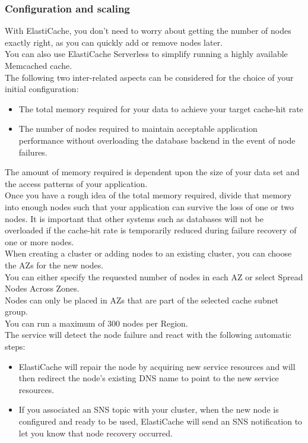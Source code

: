 \documentclass[12pt, letterpaper, twoside]{article}
\begin{document}
\subsubsection{Configuration and scaling}
With ElastiCache, you don't need to worry about getting the number of nodes exactly right, as you can quickly add 
or remove nodes later.\\
You can also use ElastiCache Serverless to simplify running a highly available Memcached cache.\\
The following two inter-related aspects can be considered for the choice of your initial configuration:
\begin{itemize}
	\item The total memory required for your data to achieve your target cache-hit rate
	\item The number of nodes required to maintain acceptable application performance without overloading the database 
		backend in the event of node failures.
\end{itemize}
The amount of memory required is dependent upon the size of your data set and the access patterns of your application.\\
Once you have a rough idea of the total memory required, divide that memory into enough nodes such that your application 
can survive the loss of one or two nodes.
It is important that other systems such as databases will not be overloaded if the cache-hit rate is temporarily reduced 
during failure recovery of one or more nodes.\\

When creating a cluster or adding nodes to an existing cluster, you can choose the AZs for the new nodes.\\
You can either specify the requested number of nodes in each AZ or select Spread Nodes Across Zones.\\
Nodes can only be placed in AZs that are part of the selected cache subnet group.\\

You can run a maximum of 300 nodes per Region.\\

The service will detect the node failure and react with the following automatic steps:
\begin{itemize}
	\item ElastiCache will repair the node by acquiring new service resources and will then redirect the node's existing 
		DNS name to point to the new service resources.
	\item If you associated an SNS topic with your cluster, when the new node is configured and ready to be used, 
		ElastiCache will send an SNS notification to let you know that node recovery occurred.\\
\end{itemize}
\end{document}
